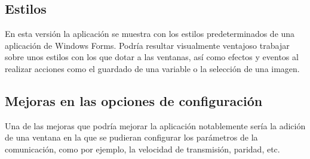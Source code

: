 \subsection{Estilos}

En esta versión la aplicación se muestra con los estilos predeterminados de una aplicación de Windows Forms. Podría resultar visualmente ventajoso trabajar sobre unos estilos con los que dotar a las ventanas, así como efectos y eventos al realizar acciones como el guardado de una variable o la selección de una imagen.

\subsection{Mejoras en las opciones de configuración}

Una de las mejoras que podría mejorar la aplicación notablemente sería la adición de una ventana en la que se pudieran configurar los parámetros de la comunicación, como por ejemplo, la velocidad de transmisión, paridad, etc.